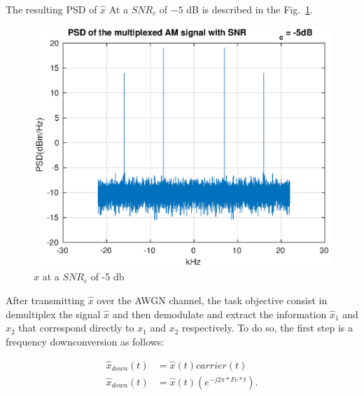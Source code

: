 \documentclass[
	12pt,				%
	openright,			%
	oneside,			%
	a4paper,			%
	chapter=TITLE,		%
	english,			%
	french,				%
	spanish,			%
	brazil				%
	]{abntex2}
\theoremstyle{definition}
\begin{document}
The resulting PSD of $\hat{x}$ At a $SNR_c$ of $-5$ dB is described in the Fig.~\ref{fig:multi_5}.

\begin{figure}[h!]
	\centering
	\includegraphics{imagens/multiplexed_5db.eps}
	\caption{$\hat{x}$ at a $SNR_c$ of -5 db}
	\label{fig:multi_5}
\end{figure}

After transmitting $\hat{x}$ over the AWGN channel, the task objective consist in demultiplex the signal $\hat{x}$ and then demodulate and extract the information $\hat{x}_1$ and $\hat{x}_2$ that correspond directly to $x_1$ and $x_2$ respectively. To do so, the first step is a frequency downconversion as follows:

\begin{align}
	\hat{x}_{down}(t) &= \hat{x}(t)carrier(t) \\ \nonumber
	\hat{x}_{down}(t) &= \hat{x}(t)(e^{-j2\pi*Fc*t}).
\end{align}
\end{document}
